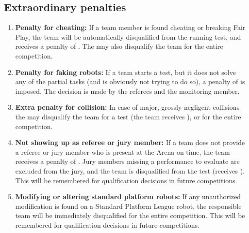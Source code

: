 \subsection{Extraordinary penalties}\label{rule:extraordinary_penalties}
\begin{enumerate}
	\item \textbf{Penalty for cheating:} If a team member is found cheating or breaking Fair Play, the team will be automatically disqualified from the running test, and receives a penalty of .
	The \TC{} may also disqualify the team for the entire competition.

	\item \textbf{Penalty for faking robots:} If a team starts a test, but it does not solve any of the partial tasks (and is obviously not trying to do so), a penalty of  is imposed.
	The decision is made by the referees and the monitoring \TC{} member.

	\item \textbf{Extra penalty for collision:} In case of major, grossly negligent collisions the \TC{} may disqualify the team for a test (the team receives ), or for the entire competition.

	\item \textbf{Not showing up as referee or jury member:} If a team does not provide a referee or jury member who is present at the Arena on time, the team receives a penalty of .
	Jury members missing a performance to evaluate are excluded from the jury, and the team is disqualified from the test (receives ).
	This will be remembered for qualification decisions in future competitions.

	\item \textbf{Modifying or altering standard platform robots:} If any unauthorized modification is found on a Standard Platform League robot, the responsible team will be immediately disqualified for the entire competition. 
	This will be remembered for qualification decisions in future competitions.
\end{enumerate}

